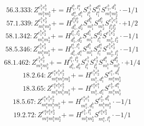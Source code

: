 \documentclass[letterpaper,10pt,fleqn,leqno,onecolumn]{article}
\begin{document}
\begin{equation} \;\;\;\;\;\;  56.3.333: Z^{e_{1}^{b}e_{2}^{b}}_{m_{1}^{b}m_{2}^{b}}+=H^{l_{1}^{b},l_{1}^{a}}_{d_{1}^{a},d_{1}^{b}}S^{e_{1}^{b}}_{l_{1}^{b}}S^{d_{1}^{a}}_{l_{1}^{a}}S^{e_{2}^{b},d_{1}^{b}}_{m_{1}^{b}m_{2}^{b}}\cdot -1/1 \end{equation}
\begin{equation} \;\;\;\;\;\;  57.1.339: Z^{e_{1}^{b}e_{2}^{b}}_{m_{1}^{b}m_{2}^{b}}+=H^{l_{1}^{b}l_{2}^{b}}_{d_{1}^{b},d_{2}^{b}}S^{d_{1}^{b}}_{m_{1}^{b}}S^{d_{2}^{b}}_{m_{2}^{b}}S^{e_{1}^{b}e_{2}^{b}}_{l_{1}^{b}l_{2}^{b}}\cdot +1/2 \end{equation}
\begin{equation} \;\;\;\;\;\;  58.1.342: Z^{e_{1}^{b}e_{2}^{b}}_{m_{1}^{b}m_{2}^{b}}+=H^{l_{1}^{b},l_{2}^{b}}_{d_{1}^{b},d_{2}^{b}}S^{d_{1}^{b}}_{m_{1}^{b}}S^{d_{2}^{b}}_{l_{1}^{b}}S^{e_{1}^{b}e_{2}^{b}}_{m_{2}^{b},l_{2}^{b}}\cdot -1/1 \end{equation}
\begin{equation} \;\;\;\;\;\;  58.5.346: Z^{e_{1}^{b}e_{2}^{b}}_{m_{1}^{b}m_{2}^{b}}+=H^{l_{1}^{a},l_{1}^{b}}_{d_{1}^{b},d_{1}^{a}}S^{d_{1}^{b}}_{m_{1}^{b}}S^{d_{1}^{a}}_{l_{1}^{a}}S^{e_{1}^{b}e_{2}^{b}}_{m_{2}^{b},l_{1}^{b}}\cdot -1/1 \end{equation}
\begin{equation} \;\;\;\;\;\;  68.1.462: Z^{e_{1}^{b}e_{2}^{b}}_{m_{1}^{b}m_{2}^{b}}+=H^{l_{1}^{b},l_{2}^{b}}_{d_{1}^{b},d_{2}^{b}}S^{e_{1}^{b}}_{l_{1}^{b}}S^{e_{2}^{b}}_{l_{2}^{b}}S^{d_{1}^{b}}_{m_{1}^{b}}S^{d_{2}^{b}}_{m_{2}^{b}}\cdot +1/4 \end{equation}
\begin{equation} \;\;\;\;\;\;  18.2.64: Z^{e_{1}^{a}e_{1}^{b}e_{2}^{b}}_{m_{1}^{a}m_{1}^{b}m_{2}^{b}}+=H^{e_{1}^{b}e_{2}^{b}}_{m_{1}^{b},d_{1}^{b}}S^{e_{1}^{a},d_{1}^{b}}_{m_{1}^{a}m_{2}^{b}} \end{equation}
\begin{equation} \;\;\;\;\;\;  18.3.65: Z^{e_{1}^{a}e_{1}^{b}e_{2}^{b}}_{m_{1}^{a}m_{1}^{b}m_{2}^{b}}+=H^{e_{1}^{a}e_{1}^{b}}_{m_{1}^{b},d_{1}^{a}}S^{e_{2}^{b},d_{1}^{a}}_{m_{1}^{a}m_{2}^{b}} \end{equation}
\begin{equation} \;\;\;\;\;\;  18.5.67: Z^{e_{1}^{a}e_{1}^{b}e_{2}^{b}}_{m_{1}^{a}m_{1}^{b}m_{2}^{b}}+=H^{e_{1}^{a}e_{1}^{b}}_{m_{1}^{a},d_{1}^{b}}S^{e_{2}^{b},d_{1}^{b}}_{m_{1}^{b}m_{2}^{b}}\cdot -1/1 \end{equation}
\begin{equation} \;\;\;\;\;\;  19.2.72: Z^{e_{1}^{a}e_{1}^{b}e_{2}^{b}}_{m_{1}^{a}m_{1}^{b}m_{2}^{b}}+=H^{e_{1}^{b},l_{1}^{b}}_{m_{1}^{b}m_{2}^{b}}S^{e_{1}^{a}e_{2}^{b}}_{m_{1}^{a},l_{1}^{b}}\cdot -1/1 \end{equation}
\end{document}
